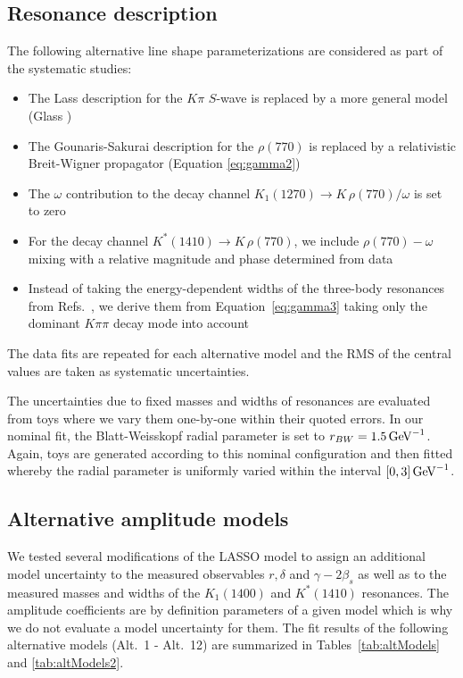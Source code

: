 \subsection{Resonance description}
\label{ssec:lineshapeSys}
The following alternative line shape parameterizations are considered as part of the systematic studies:
\begin{itemize}

	\item The Lass description for the $K\pi$ $S$-wave is replaced by a more general model (Glass \cite{delAmoSanchez:2010xz,Aaij:2015lsa})
	\item The Gounaris-Sakurai description for the $\rho(770)$ is replaced by a relativistic Breit-Wigner propagator (Equation \ref{eq:gamma2})
	\item The $\omega$ contribution to the decay channel $K_1(1270) \to K \, \rho(770)/\omega$ is set to zero
	\item For the decay channel $K^{*}(1410) \to K \, \rho(770)$, we include $\rho(770)-\omega$ mixing with a relative magnitude and phase determined from data
	\item Instead of taking the energy-dependent widths of the three-body resonances from Refs.~\cite{dArgent:2017gzv,Aaij:2017kbo}, 
	we derive them from Equation~\ref{eq:gamma3} 
	taking only the dominant $K\pi\pi$ decay mode into account

\end{itemize}
The data fits are repeated for each alternative model and 
the RMS of the
central values are taken as systematic uncertainties. 

The uncertainties due to fixed masses and widths of resonances are evaluated
from toys where we vary them one-by-one within their quoted errors. 
In our nominal fit, the Blatt-Weisskopf radial parameter is set to $r_{BW}=1.5 \mathrm{\,Ge\kern -0.1em V}^{-1}$. 
Again, toys are generated according to this nominal configuration 
and then fitted whereby the radial parameter is uniformly varied within the interval $[0,3] \mathrm{\,Ge\kern -0.1em V}^{-1}$.


\subsection{Alternative amplitude models}
\label{ssec:altModels}

We tested several modifications of the LASSO model to assign an additional model uncertainty to the measured observables $r,\delta$ and $\gamma-2\beta_s$ as well as to 
the measured masses and widths of the $K_1(1400)$ and $K^*(1410)$ resonances.
The amplitude coefficients are by definition parameters of a given model which is why we do not evaluate a model uncertainty for them.
The fit results of the following alternative models (Alt.~1 - Alt.~12) are summarized in Tables~\ref{tab:altModels} and \ref{tab:altModels2}.

